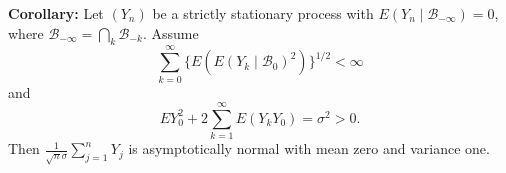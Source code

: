 \textbf{Corollary:} Let $(Y_n)$ be a strictly stationary process with $E(Y_n \mid \mathcal{B}_{-\infty}) = 0$, where $\mathcal{B}_{-\infty} = \bigcap_{k} \mathcal{B}_{-k}$. Assume
$$\sum_{k=0}^{\infty} \{E(E(Y_k \mid \mathcal{B}_0)^2)\}^{1/2} < \infty$$
and
$$E Y_0^2 + 2 \sum_{k=1}^{\infty} E(Y_k Y_0) = \sigma^2 > 0.$$
Then $\frac{1}{\sqrt{n}\sigma} \sum_{j=1}^{n} Y_j$ is asymptotically normal with mean zero and variance one.
